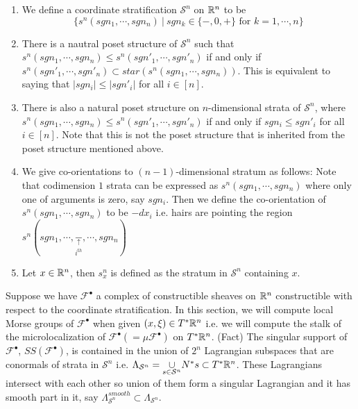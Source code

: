 \begin{definition}
\begin{enumerate}
\item We define a coordinate stratification $\mathcal{S}^n$ on $\mathbb{R}^n$ to be 
\[
\{s^n(sgn_1,\cdots, sgn_n) ~|~ sgn_k \in \{-,0,+\}\text{ for }k=1,\cdots,n\}
\]

\item There is a nautral poset structure of $\mathcal{S}^n$ such that $s^n(sgn_1,\cdots, sgn_n)\leq s^n(sgn'_1,\cdots, sgn'_n)$ if and only if $s^n(sgn'_1,\cdots, sgn'_n) \subset star(s^n(sgn_1,\cdots, sgn_n))$. This is equivalent to saying that $|sgn_i| \leq |sgn'_i|$ for all $i\in [n]$.

\item There is also a natural poset structure on $n$-dimensional strata of $\mathcal{S}^n$, where $s^n(sgn_1,\cdots, sgn_n)\leq s^n(sgn'_1,\cdots, sgn'_n)$ if and only if $sgn_i \leq sgn'_i$ for all $i\in [n]$. Note that this is not the poset structure that is inherited from the poset structure mentioned above.

\item We give co-orientations to $(n-1)$-dimensional stratum as follows: Note that codimension $1$ strata can be expressed as $s^n(sgn_1,\cdots,sgn_n)$ where only one of arguments is zero, say $sgn_i$. Then we define the co-orientation of $s^n(sgn_1,\cdots,sgn_n)$ to be $-dx_i$ i.e. hairs are pointing the region $s^n(sgn_1,\cdots,\underset{i^{th}}{\underset{\uparrow}{-}},\cdots,sgn_n)$

\item Let $x\in \mathbb{R}^n$, then $s^n_x$ is defined as the stratum in $\mathcal{S}^n$ containing $x$.
\end{enumerate}
\end{definition}
Suppose we have 
$\mathscr{F}^\bullet$ a complex of constructible sheaves on $\mathbb{R}^n$ constructible with respect to the coordinate stratification. In this section, we will compute local Morse groups of $\mathscr{F}^\bullet$ when given $(x,\xi)\in T^*\mathbb{R}^n$ i.e. we will compute the stalk of the microlocalization of $\mathscr{F}^\bullet(=\mu \mathscr{F}^\bullet)$ on $T^*\mathbb{R}^n$.
(Fact) The singular support of $\mathscr{F}^\bullet$, $SS(\mathscr{F}^\bullet)$, is contained in the union of $2^n$ Lagrangian subspaces that are conormals of strata in $\mathcal{S}^n$ i.e. $\Lambda_{\mathcal{S}^n} = \underset{s\in \mathcal{S}^n}{\cup} N^*s \subset T^*\mathbb{R}^n$. These Lagrangians intersect with each other so union of them form a singular Lagrangian and it has smooth part in it, say $\Lambda_{\mathcal{S}^n}^{smooth}\subset \Lambda_{\mathcal{S}^n}$.
